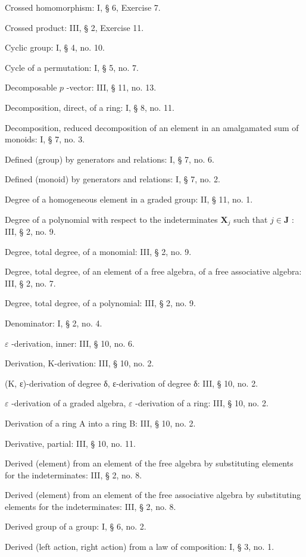 Crossed homomorphism: I, § 6, Exercise 7.

Crossed product: III, § 2, Exercise 11.

Cyclic group: I, § 4, no. 10.

Cycle of a permutation: I, § 5, no. 7.

Decomposable \(p\) -vector: III, § 11, no. 13.

Decomposition, direct, of a ring: I, § 8, no. 11.

Decomposition, reduced decomposition of an element in an amalgamated sum of monoids: I, § 7, no. 3.

Defined (group) by generators and relations: I, § 7, no. 6.

Defined (monoid) by generators and relations: I, § 7, no. 2.

Degree of a homogeneous element in a graded group: II, § 11, no. 1.

Degree of a polynomial with respect to the indeterminates \(\mathbf{X}_j\) such that \(j\in \mathbf{J}\) : III, § 2, no. 9.

Degree, total degree, of a monomial: III, § 2, no. 9.

Degree, total degree, of an element of a free algebra, of a free associative algebra: III, § 2, no. 7.

Degree, total degree, of a polynomial: III, § 2, no. 9.

Denominator: I, § 2, no. 4.

\(\varepsilon\) -derivation, inner: III, § 10, no. 6.

Derivation, K-derivation: III, § 10, no. 2.

(K, ε)-derivation of degree δ, ε-derivation of degree δ: III, § 10, no. 2.

\(\varepsilon\) -derivation of a graded algebra, \(\varepsilon\) -derivation of a ring: III, § 10, no. 2.

Derivation of a ring A into a ring B: III, § 10, no. 2.

Derivative, partial: III, § 10, no. 11.

Derived (element) from an element of the free algebra by substituting elements for the indeterminates: III, § 2, no. 8.

Derived (element) from an element of the free associative algebra by substituting elements for the indeterminates: III, § 2, no. 8.

Derived group of a group: I, § 6, no. 2.

Derived (left action, right action) from a law of composition: I, § 3, no. 1.

